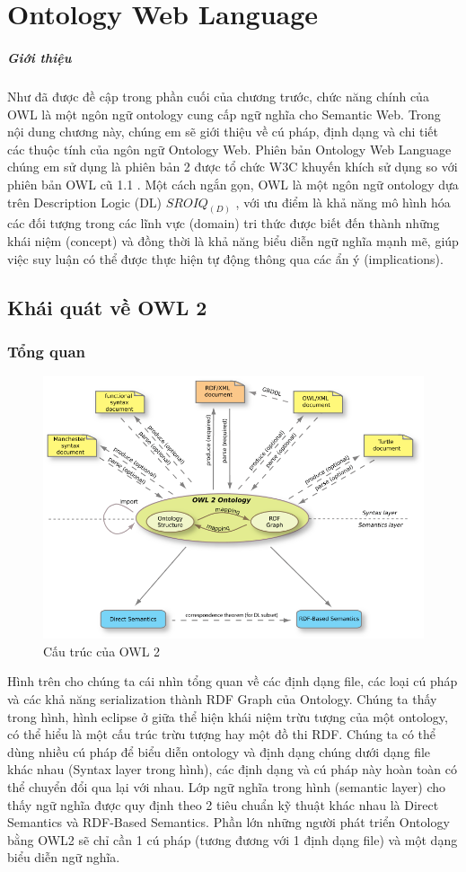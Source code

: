 \chapter{Ontology Web Language}
\paragraph{Giới thiệu }Như đã được đề cập trong phần cuối của chương trước, chức năng chính của OWL là một ngôn ngữ ontology cung cấp ngữ nghĩa cho Semantic Web. Trong nội dung chương này, chúng em sẽ giới thiệu về cú pháp, định dạng và chi tiết các thuộc tính của ngôn ngữ Ontology Web. Phiên bản Ontology Web Language chúng em sử dụng là phiên bản 2 \cite{owl2} được tổ chức W3C khuyến khích sử dụng so với phiên bản OWL cũ 1.1 . Một cách ngắn gọn, OWL là một ngôn ngữ ontology dựa trên Description Logic (DL) $SROIQ_{(D)}$ \cite{DL}, với ưu điểm là khả năng mô hình hóa các đối tượng trong các lĩnh vực (domain) tri thức được biết đến thành những khái niệm (concept) và đồng thời là khả năng biểu diễn ngữ nghĩa mạnh mẽ, giúp việc suy luận có thể được thực hiện tự động thông qua các ẩn ý (implications).

\clearpage
\section{Khái quát về OWL 2}
\subsection{Tổng quan}
\begin{figure}[ht!]
	\centering
	\includegraphics[width=120mm]{Figures/owl2structure.png}
	\caption{Cấu trúc của OWL 2\label{overflow}}
\end{figure}
Hình trên cho chúng ta cái nhìn tổng quan về các định dạng file, các loại cú pháp và các khả năng serialization thành RDF Graph của Ontology. Chúng ta thấy trong hình, hình eclipse ở giữa thể hiện khái niệm trừu tượng của một ontology, có thể hiểu là một cấu trúc trừu tượng hay một đồ thi RDF. Chúng ta có thể dùng nhiều cú pháp để biểu diễn ontology và định dạng chúng dưới dạng file khác nhau (Syntax layer trong hình), các định dạng và cú pháp này hoàn toàn có thể chuyển đổi qua lại với nhau. Lớp ngữ nghĩa trong hình (semantic layer) cho thấy ngữ nghĩa được quy định theo 2 tiêu chuẩn kỹ thuật khác nhau là Direct Semantics và RDF-Based Semantics. Phần lớn những người phát triển Ontology bằng OWL2 sẽ chỉ cần 1 cú pháp (tương đương với 1 định dạng file) và một dạng biểu diễn ngữ nghĩa.
